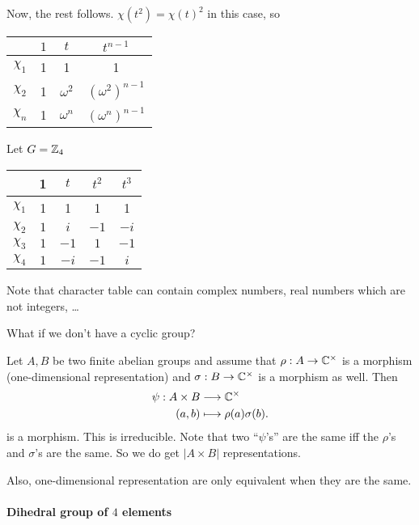 Now, the rest follows. $\chi(t^2) = \chi(t)^2$ in this case, so

\begin{center}\begin{tabular}{cccc}
     & $1$ &  $t$ &  $t^{n-1}$\\ \hline
    $\chi_{1}$ & 1& 1&1\\
    $\chi_{2}$ & 1 & $\omega^{2}$ & $(\omega^{2})^{n-1}$\\
    $\chi_{n}$ & 1 & $\omega^{n}$ & $(\omega^{n})^{n-1}$\\
\end{tabular}\end{center}

\begin{eg}
    Let $G = \mathbb{Z}_4$

    \begin{center}\begin{tabular}{ccccc}
         & 1 & $t$ &  $t^2$ & $t^3$ \\\hline
        $\chi_{1}$ & 1 & 1 & 1 & 1\\
        $\chi_{2}$ & $1$ &  $i$ &  $-1$ &  $-i$\\
        $\chi_{3}$ & $1$ &  $-1$ &  $1$ &  $-1$\\
        $\chi_{4}$ & $1$ &  $-i$ &  $-1$ &  $i$\\
    \end{tabular}\end{center}
    
    Note that character table can contain complex numbers, real numbers which are not integers, \ldots
\end{eg}

What if we don't have a cyclic group?


Let $A, B$ be two finite abelian groups and assume that  $\rho: A \to  \mathbb{C}^{\times }$ is a morphism (one-dimensional representation) and $\sigma: B \to  \mathbb{C}^{\times }$ is a morphism as well.
Then
\begin{align*}
    \psi: A \times B &\longrightarrow \mathbb{C}^{\times } \\
    (a,b) &\longmapsto \rho(a)\sigma(b)
.\end{align*}
is a morphism.
This is irreducible. Note that two ``$\psi$'s'' are the same iff the $\rho$'s and $\sigma$'s are the same. So we do get $|A\times B|$ representations.

Also, one-dimensional representation are only equivalent when they are the same.


\paragraph{Dihedral group of $4$ elements}

